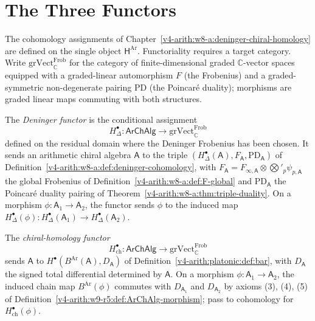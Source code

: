 \section{The Three Functors}
\label{v4-arith:w9-r5:three-functors}

The cohomology assignments of
Chapter~\ref{v4-arith:w8-a:deninger-chiral-homology} are defined on the
single object \(\mathsf{H}^{\mathrm{Ar}}\). Functoriality requires a
target category. Write \(\mathrm{grVect}_{\mathbb{C}}^{\mathrm{Frob}}\)
for the category of finite-dimensional graded \(\mathbb{C}\)-vector spaces
equipped with a graded-linear automorphism \(F\) (the Frobenius) and a
graded-symmetric non-degenerate pairing \(\mathrm{PD}\) (the Poincar\'e
duality); morphisms are graded linear maps commuting with both structures.

\begin{definition}
\label{v4-arith:w9-r5:def:functor-Delta}
The \emph{Deninger functor} is the conditional assignment
\begin{equation}
\label{v4-arith:w9-r5:eq:functor-Delta}
H^{\bullet}_{\Delta}\colon
\mathsf{ArChAlg}\longrightarrow
\mathrm{grVect}_{\mathbb{C}}^{\mathrm{Frob}}
\end{equation}
defined on the residual domain where the Deninger Frobenius has been chosen. It
sends an arithmetic chiral algebra \(\mathsf{A}\) to the triple
\((H^{\bullet}_{\Delta}(\mathsf{A}),F_{\mathsf{A}},\mathrm{PD}_{\mathsf{A}})\)
of Definition~\ref{v4-arith:w8-a:def:deninger-cohomology}, with
\(F_{\mathsf{A}}=F_{\infty,\mathsf{A}}\otimes\bigotimes'_{p}\psi_{p,\mathsf{A}}\)
the global Frobenius of Definition~\ref{v4-arith:w8-a:def:F-global} and
\(\mathrm{PD}_{\mathsf{A}}\) the Poincar\'e duality pairing of
Theorem~\ref{v4-arith:w8-a:thm:triple-duality}. On a morphism
\(\phi\colon\mathsf{A}_{1}\to\mathsf{A}_{2}\), the functor sends
\(\phi\) to the induced map
\(H^{\bullet}_{\Delta}(\phi)\colon H^{\bullet}_{\Delta}(\mathsf{A}_{1})\to H^{\bullet}_{\Delta}(\mathsf{A}_{2})\).
\end{definition}

\begin{definition}
\label{v4-arith:w9-r5:def:functor-ch}
The \emph{chiral-homology functor}
\begin{equation}
\label{v4-arith:w9-r5:eq:functor-ch}
H^{\bullet}_{\mathrm{ch}}\colon
\mathsf{ArChAlg}\longrightarrow
\mathrm{grVect}_{\mathbb{C}}^{\mathrm{Frob}}
\end{equation}
sends \(\mathsf{A}\) to
\(H^{\bullet}(B^{\mathrm{Ar}}(\mathsf{A}),D_{\mathsf{A}})\) of
Definition~\ref{v4-arith:platonic:def:bar}, with \(D_{\mathsf{A}}\) the
signed total differential determined by \(\mathsf{A}\). On a morphism
\(\phi\colon\mathsf{A}_{1}\to\mathsf{A}_{2}\), the induced chain map
\(B^{\mathrm{Ar}}(\phi)\) commutes with \(D_{\mathsf{A}_{1}}\) and
\(D_{\mathsf{A}_{2}}\) by axioms (3), (4), (5) of
Definition~\ref{v4-arith:w9-r5:def:ArChAlg-morphism}; pass to cohomology for
\(H^{\bullet}_{\mathrm{ch}}(\phi)\).
\end{definition}

